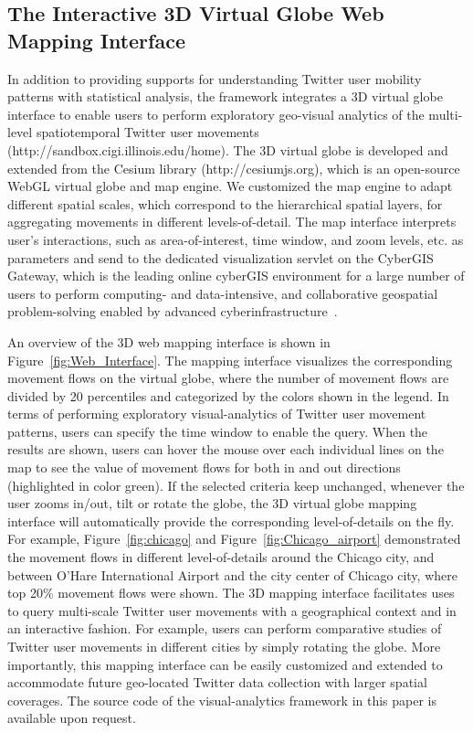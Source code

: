 \documentclass[ijgi,article,accept,moreauthors,pdftex,10pt,a4paper]{mdpi}
\theoremstyle{mdpi}
\newcounter{ex}
\newcounter{re}
\theoremstyle{mdpidefinition}
\begin{document}
\subsection{The Interactive 3D Virtual Globe Web Mapping Interface}
In addition to providing supports for understanding Twitter user mobility patterns with statistical analysis, the framework integrates a 3D virtual globe interface to enable users to perform exploratory geo-visual analytics of the multi-level spatiotemporal Twitter user movements (http://sandbox.cigi.illinois.edu/home). 
The 3D virtual globe is developed and extended from the Cesium library (http://cesiumjs.org), which is an open-source WebGL virtual globe and map engine.
We customized the map engine to adapt different spatial scales, which correspond to the hierarchical spatial layers, for aggregating movements in different levels-of-detail.
The map interface interprets user's interactions, such as area-of-interest, time window, and zoom levels, etc. as parameters and send to the dedicated visualization servlet on the CyberGIS Gateway, which is the leading online cyberGIS environment for a large number of users to perform computing- and data-intensive, and collaborative geospatial problem-solving enabled by advanced cyberinfrastructure~\cite{liu2014cybergis}.

An overview of the 3D web mapping interface is shown in Figure~\ref{fig:Web_Interface}.
The mapping interface visualizes the corresponding movement flows on the virtual globe, where the number of movement flows are divided by 20 percentiles and categorized by the colors shown in the legend.
In terms of performing exploratory visual-analytics of Twitter user movement patterns, users can specify the time window to enable the query. 
When the results are shown, users can hover the mouse over each individual lines on the map to see the value of movement flows for both in and out directions (highlighted in color green).
If the selected criteria keep unchanged, whenever the user zooms in/out, tilt or rotate the globe, the 3D virtual globe mapping interface will automatically provide the corresponding level-of-details on the fly.
For example, Figure~\ref{fig:chicago} and Figure~\ref{fig:Chicago_airport} demonstrated the movement flows in different level-of-details around the Chicago city, and between O'Hare International Airport and the city center of Chicago city, where top 20$\%$ movement flows were shown.
The 3D mapping interface facilitates uses to query multi-scale Twitter user movements with a geographical context and in an interactive fashion.
For example, users can perform comparative studies of Twitter user movements in different cities by simply rotating the globe. 
More importantly, this mapping interface can be easily customized and extended to accommodate future geo-located Twitter data collection with larger spatial coverages.
The source code of the visual-analytics framework in this paper is available upon request.
\end{document}
